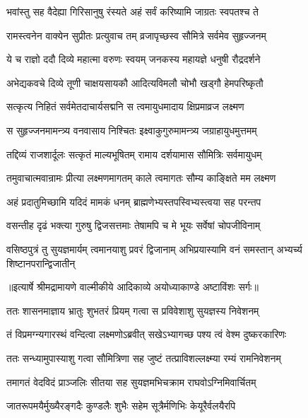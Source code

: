 \twolineshloka
{भवांस्तु सह वैदेह्या गिरिसानुषु रंस्यते}
{अहं सर्वं करिष्यामि जाग्रतः स्वपतश्च ते} %

\twolineshloka
{रामस्त्वनेन वाक्येन सुप्रीतः प्रत्युवाच तम्}
{व्रजापृच्छस्व सौमित्रे सर्वमेव सुहृज्जनम्} %

\twolineshloka
{ये च राज्ञो ददौ दिव्ये महात्मा वरुणः स्वयम्}
{जनकस्य महायज्ञे धनुषी रौद्रदर्शने} %

\twolineshloka
{अभेद्यकवचे दिव्ये तूणी चाक्षयसायकौ}
{आदित्यविमलौ चोभौ खड्गौ हेमपरिष्कृतौ} %

\twolineshloka
{सत्कृत्य निहितं सर्वमेतदाचार्यसद्मनि}
{स त्वमायुधमादाय क्षिप्रमाव्रज लक्ष्मण} %

\twolineshloka
{स सुहृज्जनमामन्त्र्य वनवासाय निश्चितः}
{इक्ष्वाकुगुरुमामन्त्र्य जग्राहायुधमुत्तमम्} %

\twolineshloka
{तद्दिव्यं राजशार्दूलः सत्कृतं माल्यभूषितम्}
{रामाय दर्शयामास सौमित्रिः सर्वमायुधम्} %

\twolineshloka
{तमुवाचात्मवान्रामः प्रीत्या लक्ष्मणमागतम्}
{काले त्वमागतः सौम्य काङ्क्षिते मम लक्ष्मण} %

\twolineshloka
{अहं प्रदातुमिच्छामि यदिदं मामकं धनम्}
{ब्राह्मणेभ्यस्तपस्विभ्यस्त्वया सह परन्तप} %

\twolineshloka
{वसन्तीह दृढं भक्त्या गुरुषु द्विजसत्तमाः}
{तेषामपि च मे भूयः सर्वेषां चोपजीविनाम्} %

\fourlineindentedshloka
{वसिष्ठपुत्रं तु सुयज्ञमार्यम्}
{त्वमानयाशु प्रवरं द्विजानाम्}
{अभिप्रयास्यामि वनं समस्तान्}
{अभ्यर्च्य शिष्टानपरान्द्विजातीन्} %


{॥इत्यार्षे श्रीमद्रामायणे वाल्मीकीये आदिकाव्ये अयोध्याकाण्डे अष्टाविंशः सर्गः॥}


\twolineshloka
{ततः शासनमाज्ञाय भ्रातुः शुभतरं प्रियम्}
{गत्वा स प्रविवेशाशु सुयज्ञस्य निवेशनम्} %

\twolineshloka
{तं विप्रमग्न्यगारस्थं वन्दित्वा लक्ष्मणोऽब्रवीत्}
{सखेऽभ्यागच्छ पश्य त्वं वेश्म दुष्करकारिणः} %

\twolineshloka
{ततः सन्ध्यामुपास्याशु गत्वा सौमित्रिणा सह}
{जुष्टं तत्प्राविशल्लक्ष्म्या रम्यं रामनिवेशनम्} %

\twolineshloka
{तमागतं वेदविदं प्राञ्जलिः सीतया सह}
{सुयज्ञमभिचक्राम राघवोऽग्निमिवार्चितम्} %

\twolineshloka
{जातरूपमयैर्मुख्यैरङ्गदैः कुण्डलैः शुभैः}
{सहेम सूत्रैर्मणिभिः केयूरैर्वलयैरपि} %

